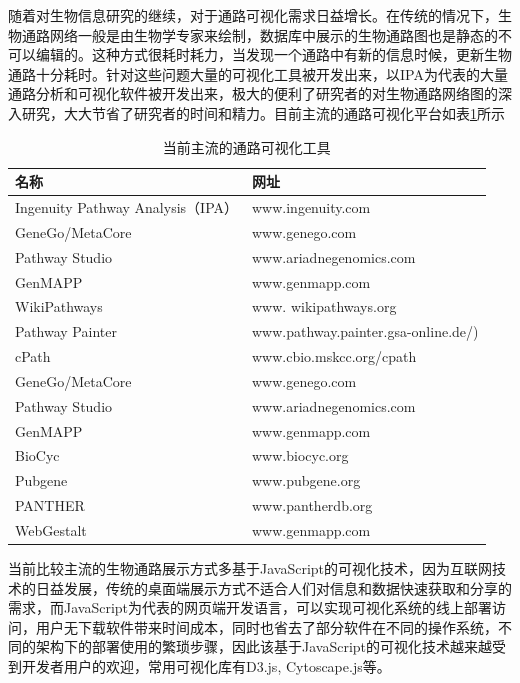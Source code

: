 随着对生物信息研究的继续，对于通路可视化需求日益增长。在传统的情况下，生物通路网络一般是由生物学专家来绘制，数据库中展示的生物通路图也是静态的不可以编辑的。这种方式很耗时耗力，当发现一个通路中有新的信息时候，更新生物通路十分耗时。针对这些问题大量的可视化工具被开发出来，以IPA为代表的大量通路分析和可视化软件被开发出来，极大的便利了研究者的对生物通路网络图的深入研究，大大节省了研究者的时间和精力。目前主流的通路可视化平台如表\ref{table2}所示

\begin{table}[htbp]
  \centering
	\caption[table2]{当前主流的通路可视化工具}
\vspace{0.5em}\wuhao
\begin{tabularx}{1.0\textwidth}{lX}
\toprule[1.5pt]
名称 & 网址 \\
\midrule[1pt]
Ingenuity Pathway Analysis（IPA）	& www.ingenuity.com\\
GeneGo/MetaCore 	& www.genego.com\\
Pathway Studio 	& www.ariadnegenomics.com\\
GenMAPP	       & www.genmapp.com\\
WikiPathways & www. wikipathways.org\\
Pathway Painter	 & www.pathway.painter.gsa-online.de/)\\
cPath	& www.cbio.mskcc.org/cpath\\
GeneGo/MetaCore 	& www.genego.com\\
Pathway Studio 	& www.ariadnegenomics.com\\
GenMAPP	& www.genmapp.com\\
BioCyc	& www.biocyc.org\\
Pubgene	& www.pubgene.org\\
PANTHER	& www.pantherdb.org\\
WebGestalt	& www.genmapp.com\\

\bottomrule[1.5pt]
\end{tabularx}
\label{table2}
\end{table}

当前比较主流的生物通路展示方式多基于JavaScript的可视化技术，因为互联网技术的日益发展，传统的桌面端展示方式不适合人们对信息和数据快速获取和分享的需求，而JavaScript为代表的网页端开发语言，可以实现可视化系统的线上部署访问，用户无下载软件带来时间成本，同时也省去了部分软件在不同的操作系统，不同的架构下的部署使用的繁琐步骤，因此该基于JavaScript的可视化技术越来越受到开发者用户的欢迎，常用可视化库有D3.js\cite{bostock2012d3}, Cytoscape.js\cite{franz2015cytoscape}等。


